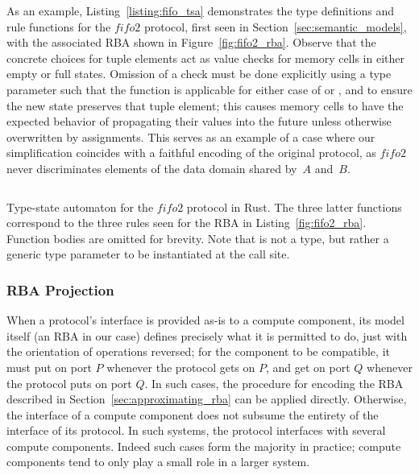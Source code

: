 As an example, Listing~\ref{listing:fifo_tsa} demonstrates the type definitions and rule functions for the $fifo2$ protocol, first seen in Section~\ref{sec:semantic_models}, with the associated RBA shown in Figure~\ref{fig:fifo2_rba}. Observe that the concrete choices for tuple elements act as value checks for memory cells in either empty or full states. Omission of a check must be done explicitly using a type parameter such that the function is applicable for either case of  or , and to ensure the new state preserves that tuple element; this causes memory cells to have the expected behavior of propagating their values into the future unless otherwise overwritten by assignments. This serves as an example of a case where our simplification coincides with a faithful encoding of the original protocol, as $fifo2$ never discriminates elements of the data domain shared by~$A$ and~$B$.


\begin{listing}[ht]
	\inputminted[]{rust}{fifo_tsa.rs}
	\caption[Type state automaton in Rust for the fifo2 connector.]{Type-state automaton for the $fifo2$ protocol in Rust. The three latter functions correspond to the three rules seen for the RBA in Listing~\ref{fig:fifo2_rba}. Function bodies are omitted for brevity. Note that  is not a type, but rather a generic type parameter to be instantiated at the call site.}
	\label{listing:fifo_tsa}
\end{listing}




\subsubsection{RBA Projection}
\label{sec:rba_projection}
When a protocol's interface is provided as-is to a compute component, its model itself (an RBA in our case) defines precisely what it is permitted to do, just with the orientation of operations reversed; for the component to be compatible, it must put on port $P$ whenever the protocol gets on $P$, and get on port $Q$ whenever the protocol puts on port $Q$. In such cases, the procedure for encoding the RBA described in Section~\ref{sec:approximating_rba} can be applied directly. Otherwise, the interface of a compute component does not subsume the entirety of the interface of its protocol. In such systems, the protocol interfaces with several compute components. Indeed such cases form the majority in practice; compute components tend to only play a small role in a larger system.

